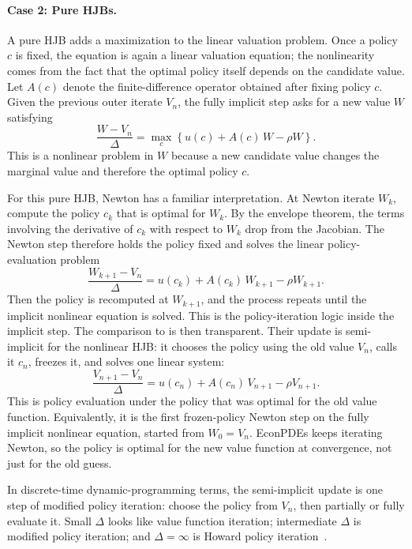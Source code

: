 \documentclass[11pt]{article}
\numberwithin{equation}{section}
\begin{document}
			\paragraph*{Case 2: Pure HJBs.} A pure HJB adds a maximization to the linear valuation problem. Once a policy $c$ is fixed, the equation is again a linear valuation equation; the nonlinearity comes from the fact that the optimal policy itself depends on the candidate value. Let $A(c)$ denote the finite-difference operator obtained after fixing policy $c$. Given the previous outer iterate $V_n$, the fully implicit step asks for a new value $W$ satisfying
		\begin{equation*}
			\frac{W-V_n}{\Delta} = \max_c \left\{u(c) + A(c)\, W - \rho W\right\}.
		\end{equation*}
		This is a nonlinear problem in $W$ because a new candidate value changes the marginal value and therefore the optimal policy $c$.

		For this pure HJB, Newton has a familiar interpretation. At Newton iterate $W_k$, compute the policy $c_k$ that is optimal for $W_k$. By the envelope theorem, the terms involving the derivative of $c_k$ with respect to $W_k$ drop from the Jacobian. The Newton step therefore holds the policy fixed and solves the linear policy-evaluation problem
		\begin{equation*}
			\frac{W_{k+1}-V_n}{\Delta} = u(c_k) + A(c_k)\, W_{k+1} - \rho W_{k+1}.
		\end{equation*}
		Then the policy is recomputed at $W_{k+1}$, and the process repeats until the implicit nonlinear equation is solved. This is the policy-iteration logic inside the implicit step. The comparison to \citet{achdou2022income} is then transparent. Their update is semi-implicit for the nonlinear HJB: it chooses the policy using the old value $V_n$, calls it $c_n$, freezes it, and solves one linear system:
		\begin{equation*}
			\frac{V_{n+1}-V_n}{\Delta} = u(c_n) + A(c_n)\, V_{n+1} - \rho V_{n+1}.
		\end{equation*}
		This is policy evaluation under the policy that was optimal for the old value function. Equivalently, it is the first frozen-policy Newton step on the fully implicit nonlinear equation, started from $W_0 = V_n$. EconPDEs keeps iterating Newton, so the policy is optimal for the new value function at convergence, not just for the old guess.

				In discrete-time dynamic-programming terms, the semi-implicit update is one step of modified policy iteration: choose the policy from $V_n$, then partially or fully evaluate it. Small $\Delta$ looks like value function iteration; intermediate $\Delta$ is modified policy iteration; and $\Delta=\infty$ is Howard policy iteration~\citep{puterman1978modified}.
\end{document}
